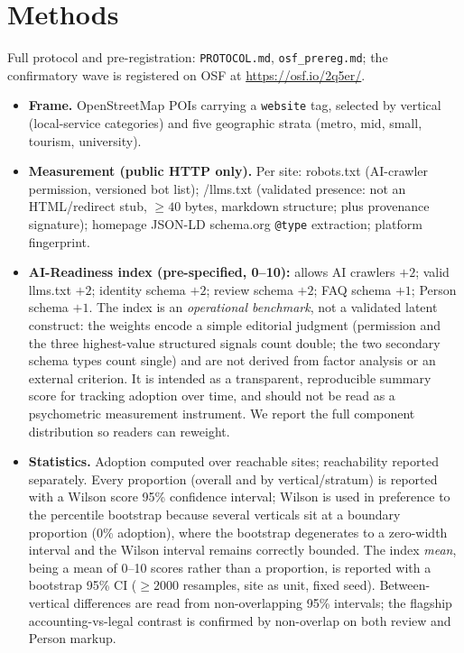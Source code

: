 \documentclass[11pt]{article}
\begin{document}
\section{Methods}

Full protocol and pre-registration: \texttt{PROTOCOL.md}, \texttt{osf\_prereg.md}; the confirmatory
wave is registered on OSF at \url{https://osf.io/2q5er/}.

\begin{itemize}
\item \textbf{Frame.} OpenStreetMap POIs carrying a \texttt{website} tag, selected by vertical
(local-service categories) and five geographic strata (metro, mid, small, tourism, university).
\item \textbf{Measurement (public HTTP only).} Per site: robots.txt (AI-crawler permission, versioned
bot list); /llms.txt (validated presence: not an HTML/redirect stub, $\geq 40$ bytes, markdown
structure; plus provenance signature); homepage JSON-LD schema.org \texttt{@type} extraction;
platform fingerprint.
\item \textbf{AI-Readiness index (pre-specified, 0--10):} allows AI crawlers $+2$; valid llms.txt
$+2$; identity schema $+2$; review schema $+2$; FAQ schema $+1$; Person schema $+1$. The index is an
\emph{operational benchmark}, not a validated latent construct: the weights encode a simple editorial
judgment (permission and the three highest-value structured signals count double; the two secondary
schema types count single) and are not derived from factor analysis or an external criterion. It is
intended as a transparent, reproducible summary score for tracking adoption over time, and should not
be read as a psychometric measurement instrument. We report the full component distribution so
readers can reweight.
\item \textbf{Statistics.} Adoption computed over reachable sites; reachability reported separately.
Every proportion (overall and by vertical/stratum) is reported with a Wilson score 95\% confidence
interval; Wilson is used in preference to the percentile bootstrap because several verticals sit at a
boundary proportion (0\% adoption), where the bootstrap degenerates to a zero-width interval and the
Wilson interval remains correctly bounded. The index \emph{mean}, being a mean of 0--10 scores rather
than a proportion, is reported with a bootstrap 95\% CI ($\geq 2000$ resamples, site as unit, fixed
seed). Between-vertical differences are read from non-overlapping 95\% intervals; the flagship
accounting-vs-legal contrast is confirmed by non-overlap on both review and Person markup.
\end{itemize}
\end{document}
